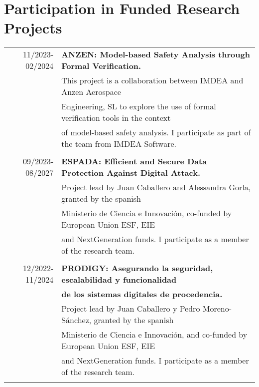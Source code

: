 \documentclass[a4paper,10pt]{article} %
\begin{document}
\section{Participation in Funded Research Projects}
\begin{longtable}{rl}

\textsc{11/2023-02/2024} & \textbf{ANZEN: Model-based Safety Analysis through Formal Verification.} \\ 
& This project is a collaboration between IMDEA and Anzen Aerospace \\
& Engineering, SL to explore the use of formal verification tools in the context \\
& of model-based safety analysis. I participate as part of the team from IMDEA Software. \\ & \\

\textsc{09/2023-08/2027} & \textbf{ESPADA: Efficient and Secure Data Protection Against Digital Attack.} \\ 
& Project lead by Juan Caballero and Alessandra Gorla, granted by the spanish \\ 
& Ministerio de Ciencia e Innovación, co-funded by European Union ESF, EIE \\
& and NextGeneration funds. I participate as a member of the research team. \\ & \\

\textsc{12/2022-11/2024} & \textbf{PRODIGY: Asegurando la seguridad, escalabilidad y funcionalidad} \\
& \textbf{de los sistemas digitales de procedencia.} \\ 
& Project lead by Juan Caballero y Pedro Moreno-Sánchez, granted by the spanish \\
& Ministerio de Ciencia e Innovación, and co-funded by European Union ESF, EIE \\
& and NextGeneration funds. I participate as a member of the research team. \\ & \\

\end{longtable}
\end{document}
